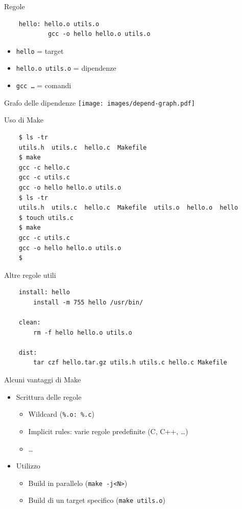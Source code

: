 \documentclass[xetex,table]{beamer}
\begin{document}
\begin{frame}[fragile]{Regole}
  \begin{verbatim}
    hello: hello.o utils.o
            gcc -o hello hello.o utils.o
  \end{verbatim}

  \begin{itemize}
  \item \texttt{hello} = target
  \item \texttt{hello.o utils.o} = dipendenze
  \item \texttt{gcc \dots} = comandi
  \end{itemize}
\end{frame}

\begin{frame}{Grafo delle dipendenze}
  \center\texttt{[image: images/depend-graph.pdf]}
\end{frame}

\begin{frame}[fragile]{Uso di Make}
  \begin{verbatim}
    $ ls -tr
    utils.h  utils.c  hello.c  Makefile
    $ make
    gcc -c hello.c
    gcc -c utils.c
    gcc -o hello hello.o utils.o
    $ ls -tr
    utils.h  utils.c  hello.c  Makefile  utils.o  hello.o  hello
    $ touch utils.c
    $ make
    gcc -c utils.c
    gcc -o hello hello.o utils.o
    $
  \end{verbatim}
\end{frame}

\begin{frame}[fragile]{Altre regole utili}
  \begin{verbatim}
    install: hello
        install -m 755 hello /usr/bin/

    clean:
        rm -f hello hello.o utils.o

    dist:
        tar czf hello.tar.gz utils.h utils.c hello.c Makefile
  \end{verbatim}
\end{frame}

\begin{frame}{Alcuni vantaggi di Make}
  \begin{itemize}
  \item Scrittura delle regole
    \begin{itemize}
    \item Wildcard (\texttt{\%.o: \%.c})
    \item Implicit rules: varie regole predefinite (C, C++, \dots)
    \item \dots
    \end{itemize}
  \item Utilizzo
    \begin{itemize}
    \item Build in parallelo (\texttt{make -j<N>})
    \item Build di un target specifico (\texttt{make utils.o})
    \end{itemize}
  \end{itemize}
\end{frame}
\end{document}
